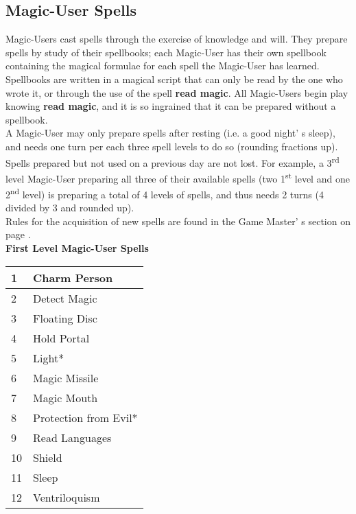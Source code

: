 \documentclass[a4paper,twoside,openany,10pt]{book}
\begin{document}
\begin{multicols}{2}
\pagebreak

\subsection{Magic-User Spells}\label{magic-user-spells}

Magic-Users cast spells through the exercise of knowledge and will. They prepare spells by study of their spellbooks; each Magic-User has their own spellbook containing the magical formulae for each spell the Magic-User has learned. Spellbooks are written in a magical script that can only be read by the one who wrote it, or through the use of the spell \textbf{read magic}. All Magic-Users begin play knowing \textbf{read magic}, and it is so ingrained that it can be prepared without a spellbook.\\

A Magic-User may only prepare spells after resting (i.e. a good night' s sleep), and needs one turn per each three spell levels to do so (rounding fractions up). Spells prepared but not used on a previous day are not lost. For example, a 3\textsuperscript{rd} level Magic-User preparing all three of their available spells (two 1\textsuperscript{st} level and one 2\textsuperscript{nd} level) is preparing a total of 4 levels of spells, and thus needs 2 turns (4 divided by 3 and rounded up).\\

Rules for the acquisition of new spells are found in the Game
Master' s section on page \hyperlink{acquisition-of-spells}{\pageref{acquisition-of-spells}}.\\

{\large \textbf{First Level Magic-User Spells}}\\

\begin{tabularx}{0.45\textwidth}{@{}ll@{}}
1 & Charm Person \\\toprule
2 & Detect Magic \\\hline
3 & Floating Disc \\\hline
4 & Hold Portal \\\hline
5 & Light* \\\hline
6 & Magic Missile \\\hline
7 & Magic Mouth \\\hline
8 & Protection from Evil* \\\hline
9 & Read Languages \\\hline
10 & Shield \\\hline
11 & Sleep \\\hline
12 & Ventriloquism \\\bottomrule
\end{tabularx}\bigskip


\end{multicols}
\end{document}
